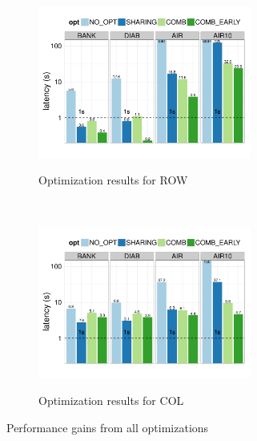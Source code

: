 \begin{figure}[h]
	\centering
	\begin{subfigure}{1\linewidth}
		\centering
		{\includegraphics[width=7cm] {Images/all_opt_real_data_row.pdf}}
		\vspace{-15pt}
		\caption{Optimization results for ROW}
		\label{fig:share_prune_row}
	\end{subfigure}\\
	\begin{subfigure}{1\linewidth}
		\centering
		{\includegraphics[width=7cm] {Images/all_opt_real_data_col.pdf}}
		\vspace{-15pt}
		\caption{Optimization results for COL}
		\label{fig:share_prune_col}
	\end{subfigure}
	\vspace{-10pt}
	\caption{Performance gains from all optimizations}
	\label{fig:all_opt_with_pruning}
	\vspace{-15pt}
\end{figure}
 
